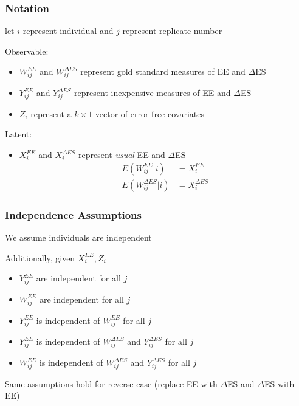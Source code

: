 \documentclass[handout]{beamer}\usepackage[]{graphicx}\usepackage[]{color}
\begin{document}
\begin{frame}
\frametitle{Notation}
let $i$ represent individual and $j$ represent replicate number \\

\vspace{0.3cm}

Observable:
\begin{itemize}
\item
$W_{ij}^{EE}$ and $W_{ij}^{\Delta ES}$ represent gold standard measures of EE and $\Delta$ES
\item
$Y_{ij}^{EE}$ and $Y_{ij}^{\Delta ES}$ represent inexpensive measures of EE and $\Delta$ES
\item
$Z_i$ represent a $k\times 1$ vector of error free covariates
\end{itemize}

\vspace{0.2cm}

Latent:
\begin{itemize}
\item
$X_{i}^{EE}$ and $X_{i}^{\Delta ES}$ represent \emph{usual} EE and $\Delta$ES \\

\begin{align*}
E(W_{ij}^{EE}|i) &= X_i^{EE}\\
E(W_{ij}^{\Delta ES}|i) &= X_i^{\Delta ES}
\end{align*}

\end{itemize}

\end{frame}


\begin{frame}
\frametitle{Independence Assumptions}
We assume individuals are independent \\

\vspace{0.2cm}

Additionally, given $X_i^{EE}, Z_i$

\begin{itemize}
\item
$Y^{EE}_{ij}$ are independent for all $j$ \\
\item
$W_{ij}^{EE}$ are independent for all $j$ \\
\item
$Y_{ij}^{EE}$ is independent of $W_{ij}^{EE}$ for all $j$ \\
\item
$Y_{ij}^{EE}$ is independent of $W_{ij}^{\Delta ES}$ and $Y_{ij}^{\Delta ES}$ for all $j$ \\
\item
$W_{ij}^{EE}$ is independent of $W_{ij}^{\Delta ES}$ and $Y_{ij}^{\Delta ES}$ for all $j$ \\
\end{itemize}

\vspace{0.2cm}

Same assumptions hold for reverse case (replace EE with $\Delta$ES and $\Delta$ES with EE)


\end{frame}
\end{document}
